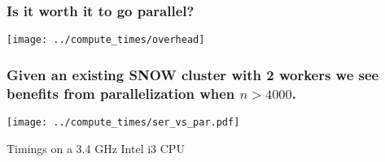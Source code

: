 \documentclass{beamer}
\begin{document}
\begin{frame}


\frametitle{Is it worth it to go parallel?}


    \centerline{\texttt{[image: ../compute\_times/overhead]}}

\end{frame}
\begin{frame}

\frametitle{Given an existing SNOW cluster with 2 workers we see benefits
    from parallelization when $n > 4000$.}

\centerline{\texttt{[image: ../compute\_times/ser\_vs\_par.pdf]}}

Timings on a 3.4 GHz Intel i3 CPU

%
%
%

%
%
%
%
%

\end{frame}
\end{document}
